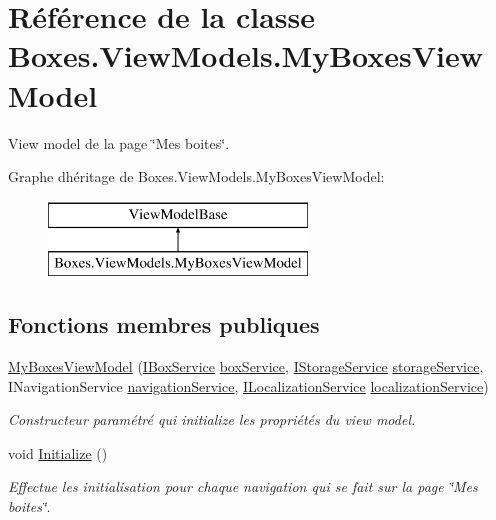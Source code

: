 \hypertarget{class_boxes_1_1_view_models_1_1_my_boxes_view_model}{}\section{Référence de la classe Boxes.\+View\+Models.\+My\+Boxes\+View\+Model}
\label{class_boxes_1_1_view_models_1_1_my_boxes_view_model}


View model de la page \char`\"{}\+Mes boites\char`\"{}.  


Graphe d\textquotesingle{}héritage de Boxes.\+View\+Models.\+My\+Boxes\+View\+Model\+:\begin{figure}[H]
\begin{center}
\leavevmode
\includegraphics[height=2.000000cm]{class_boxes_1_1_view_models_1_1_my_boxes_view_model}
\end{center}
\end{figure}
\subsection*{Fonctions membres publiques}
\begin{DoxyCompactItemize}
\item 
\hyperlink{class_boxes_1_1_view_models_1_1_my_boxes_view_model_acb7d2296ffbed617b36b9f9bd8c2d235}{My\+Boxes\+View\+Model} (\hyperlink{interface_boxes_1_1_services_1_1_box_1_1_i_box_service}{I\+Box\+Service} \hyperlink{class_boxes_1_1_view_models_1_1_my_boxes_view_model_ab3f024f0941c1630bd3f9cbf0bd6dce4}{box\+Service}, \hyperlink{interface_boxes_1_1_services_1_1_storage_1_1_i_storage_service}{I\+Storage\+Service} \hyperlink{class_boxes_1_1_view_models_1_1_my_boxes_view_model_a37f8b8ffe5a745143ce38a96a56b2ec9}{storage\+Service}, I\+Navigation\+Service \hyperlink{class_boxes_1_1_view_models_1_1_my_boxes_view_model_a2903b75047e0ab39b06061d9666572c8}{navigation\+Service}, \hyperlink{interface_boxes_1_1_services_1_1_localization_1_1_i_localization_service}{I\+Localization\+Service} \hyperlink{class_boxes_1_1_view_models_1_1_my_boxes_view_model_aaeb99d047d625e8bb77a00f0b0922b20}{localization\+Service})
\begin{DoxyCompactList}\small\item\em Constructeur paramétré qui initialize les propriétés du view model. \end{DoxyCompactList}\item 
void \hyperlink{class_boxes_1_1_view_models_1_1_my_boxes_view_model_a497e3f0b73a17b54c31e8287d42f30a9}{Initialize} ()
\begin{DoxyCompactList}\small\item\em Effectue les initialisation pour chaque navigation qui se fait sur la page \char`\"{}\+Mes boites\char`\"{}. \end{DoxyCompactList}\end{DoxyCompactItemize}
